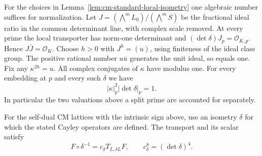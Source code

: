 For the choices in Lemma~\ref{lem:cm-standard-local-isometry}
one algebraic number suffices for normalization. Let
\(J=(\bigwedge^m L_0)/(\bigwedge^m S)\) be the fractional
ideal ratio in the common determinant line, with complex scale
removed. At every prime the local transporter has norm-one
determinant and \((\det\delta)J_p=\mathcal O_{K,p}\).
Hence \(J\bar J=\mathcal O_K\). Choose \(h>0\) with
\(J^h=(u)\), using finiteness of the ideal class group.
The positive rational number \(u\bar u\) generates the unit
ideal, so equals one. Fix any \(\kappa^{2h}=u\). All complex
conjugates of \(\kappa\) have modulus one. For every embedding
at \(p\) and every such \(\delta\) we have
\begin{equation}\label{eq:kappa-determinant}
             |\kappa|_p^2 |\det\delta|_p=1 .
\end{equation}
In particular the two valuations above a split prime are
accounted for separately.

\begin{lemma}\label{lem:theta-cayley-scalar}
For the self-dual CM lattices with the intrinsic sign above,
use an isometry \(\delta\) for which the stated Cayley
operators are defined. The transport and its scalar satisfy
\[
 F\circ\delta^{-1}=c_\delta T_{L,\delta L}F,\qquad c_\delta^8=(\det\delta)^4.
\]

\end{lemma}

